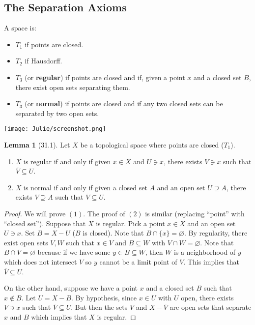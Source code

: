 \documentclass{article}
\newcommand{\nline}{\vspace*{0.5\baselineskip}}
\theoremstyle{definition}
\newtheorem{lemma}{Lemma}[subsection]
\begin{document}
\begin{flushleft}
\subsection{The Separation Axioms}

A space is:

\begin{itemize}
    \item $T_1$ if points are closed.
    \item $T_2$ if Hausdorff.
    \item $T_3$ (or \textbf{regular}) if points are closed and if, given a point $x$ and a closed set $B$, there exist open sets separating them.
    \item $T_3$ (or \textbf{normal}) if points are closed and if any two closed sets can be separated by two open sets.
\end{itemize}

\begin{center}
    \texttt{[image: Julie/screenshot.png]}
\end{center}

\begin{lemma}[31.1]
Let $X$ be a topological space where points are closed ($T_1$).
\begin{enumerate}
    \item $X$ is regular if and only if given $x \in X$ and $U \ni x$, there exists $V \ni x$ such that $\overline{V} \subseteq U$.
    \item $X$ is normal if and only if given a closed set $A$ and an open set $U \supseteq A$, there exists $V \supseteq A$ such that $\overline{V} \subseteq U$.
\end{enumerate}
\end{lemma}

\begin{proof}
We will prove $(1)$. The proof of $(2)$ is similar (replacing ``point'' with ``closed set''). Suppose that $X$ is regular. Pick a point $x \in X$ and an open set $U \ni x$. Set $B = X - U$ ($B$ is closed). Note that $B \cap \{x\} = \varnothing$. By regularity, there exist open sets $V, W$ such that $x \in V$ and $B \subseteq W$ with $V \cap W = \varnothing$. Note that $B \cap \overline{V} = \varnothing$ because if we have some $y \in B \subseteq W$, then $W$ is a neighborhood of $y$ which does not intersect $V$ so $y$ cannot be a limit point of $V$. This implies that $\overline{V} \subseteq U$.

\nline

On the other hand, suppose we have a point $x$ and a closed set $B$ such that $x \notin B$. Let $U = X - B$. By hypothesis, since $x \in U$ with $U$ open, there exists $V \ni x$ such that $\overline{V} \subseteq U$. But then the sets $V$ and $X - \overline{V}$ are open sets that separate $x$ and $B$ which implies that $X$ is regular.
\end{proof}


\end{flushleft}
\end{document}
